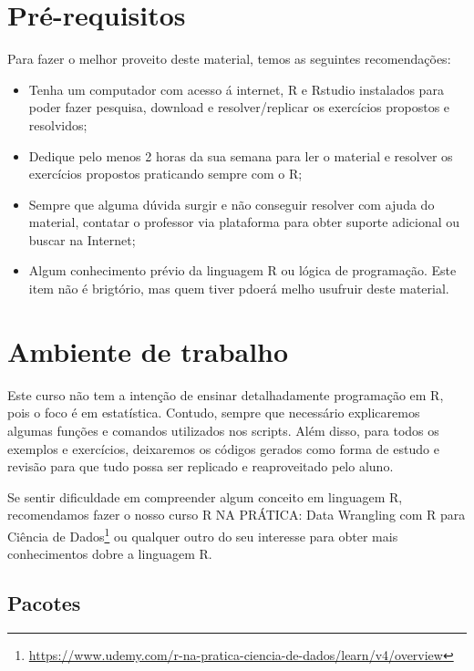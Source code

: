 \documentclass[11pt,]{style/krantz}
\renewcommand{\href}[2]{#2\footnote{\url{#1}}}
\theoremstyle{definition}
\theoremstyle{definition}
\theoremstyle{definition}
\theoremstyle{remark}
\begin{document}
\hypertarget{pre-requisitos}{%
\section*{Pré-requisitos}\label{pre-requisitos}}


Para fazer o melhor proveito deste material, temos as seguintes recomendações:

\begin{itemize}
\item
  Tenha um computador com acesso á internet, R e Rstudio instalados para poder fazer pesquisa, download e resolver/replicar os exercícios propostos e resolvidos;
\item
  Dedique pelo menos 2 horas da sua semana para ler o material e resolver os exercícios propostos praticando sempre com o R;
\item
  Sempre que alguma dúvida surgir e não conseguir resolver com ajuda do material, contatar o professor via plataforma para obter suporte adicional ou buscar na Internet;
\item
  Algum conhecimento prévio da linguagem R ou lógica de programação. Este item não é brigtório, mas quem tiver pdoerá melho usufruir deste material.
\end{itemize}

\hypertarget{ambiente-de-trabalho}{%
\section*{Ambiente de trabalho}\label{ambiente-de-trabalho}}


Este curso não tem a intenção de ensinar detalhadamente programação em R, pois o foco é em estatística. Contudo, sempre que necessário explicaremos algumas funções e comandos utilizados nos scripts. Além disso, para todos os exemplos e exercícios, deixaremos os códigos gerados como forma de estudo e revisão para que tudo possa ser replicado e reaproveitado pelo aluno.

Se sentir dificuldade em compreender algum conceito em linguagem R, recomendamos fazer o nosso curso \href{https://www.udemy.com/r-na-pratica-ciencia-de-dados/learn/v4/overview}{R NA PRÁTICA: Data Wrangling com R para Ciência de Dados} ou qualquer outro do seu interesse para obter mais conhecimentos dobre a linguagem R.

\hypertarget{pacotes}{%
\subsection*{Pacotes}\label{pacotes}}
\end{document}
